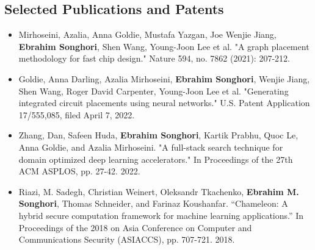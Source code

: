 \documentclass[overlapped]{res}
\begin{document}
\begin{resume}
\section{Selected Publications and Patents}
\begin{itemize}
\item Mirhoseini, Azalia, Anna Goldie, Mustafa Yazgan, Joe Wenjie Jiang, {\bf Ebrahim Songhori}, Shen Wang, Young-Joon Lee et al. "A graph placement methodology for fast chip design." Nature 594, no. 7862 (2021): 207-212.
\item Goldie, Anna Darling, Azalia Mirhoseini, {\bf Ebrahim Songhori}, Wenjie Jiang, Shen Wang, Roger David Carpenter, Young-Joon Lee et al. "Generating integrated circuit placements using neural networks." U.S. Patent Application 17/555,085, filed April 7, 2022.
\item Zhang, Dan, Safeen Huda, {\bf Ebrahim Songhori}, Kartik Prabhu, Quoc Le, Anna Goldie, and Azalia Mirhoseini. "A full-stack search technique for domain optimized deep learning accelerators." In Proceedings of the 27th ACM ASPLOS, pp. 27-42. 2022.
\item Riazi, M. Sadegh, Christian Weinert, Oleksandr Tkachenko, {\bf Ebrahim M. Songhori}, Thomas Schneider, and Farinaz Koushanfar. ``Chameleon: A hybrid secure computation framework for machine learning applications.'' In Proceedings of the 2018 on Asia Conference on Computer and Communications Security (ASIACCS), pp. 707-721. 2018.

\end{itemize}
\end{resume}
\end{document}
